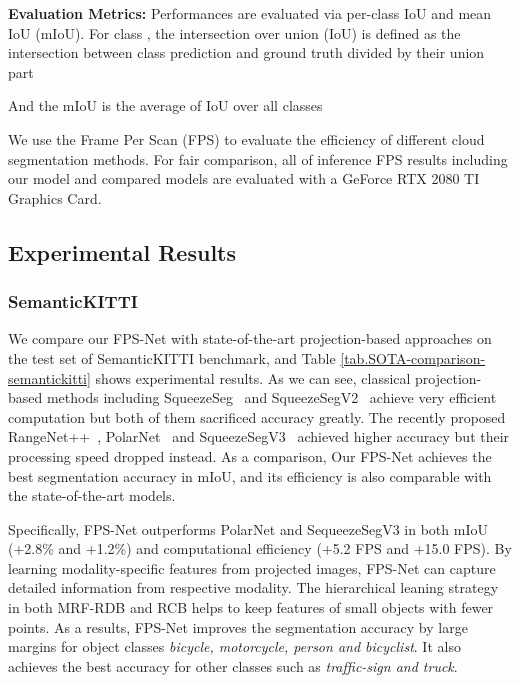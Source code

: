 \documentclass[preprint,review,3p]{elsarticle}
\begin{document}
\textbf{Evaluation Metrics:} Performances are evaluated via per-class IoU and mean IoU (mIoU). For class , the intersection over union (IoU) is defined as the intersection between class prediction  and ground truth  divided by their union part

And the mIoU is the average of IoU over all classes


We use the Frame Per Scan (FPS) to evaluate the efficiency of different cloud segmentation methods. For fair comparison, all of inference FPS results including our model and compared models are evaluated with a GeForce RTX 2080 TI Graphics Card.

\subsection{Experimental Results}\label{Sec.benchmarks_results}
\subsubsection{SemanticKITTI}

We compare our FPS-Net with 
state-of-the-art projection-based approaches on the test set of SemanticKITTI benchmark, and Table \ref{tab.SOTA-comparison-semantickitti} shows experimental results. As we can see, classical projection-based methods including SqueezeSeg~\cite{wu2018squeezeseg} and SqueezeSegV2~\cite{wu2019squeezesegv2} achieve very efficient computation but both of them sacrificed accuracy greatly. The recently proposed RangeNet++~\cite{milioto2019rangenet++}, PolarNet~\cite{zhang2020polarnet} and SqueezeSegV3~\cite{xu2020squeezesegv3} achieved higher accuracy but their processing speed dropped instead. As a comparison, Our FPS-Net achieves the best segmentation accuracy in mIoU, and its efficiency is also comparable with the state-of-the-art models.

Specifically, FPS-Net outperforms PolarNet \cite{zhang2020polarnet} and SequeezeSegV3 \cite{xu2020squeezesegv3} in both mIoU (+2.8\% and +1.2\%) and computational efficiency (+5.2 FPS and +15.0 FPS). 
By learning modality-specific features from projected images, FPS-Net can capture detailed information from respective modality. The hierarchical leaning strategy in both MRF-RDB and RCB helps to keep features of small objects with fewer points. As a results, FPS-Net improves the segmentation accuracy by large margins for object classes \textit{bicycle, motorcycle, person and bicyclist}. It also achieves the best accuracy for other classes such as \textit{traffic-sign and truck}.
\end{document}
